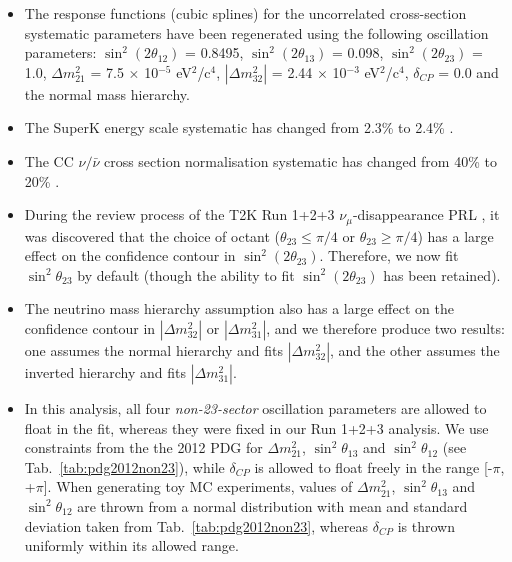 \begin{itemize}
\item 
The response functions (cubic splines) for the uncorrelated cross-section systematic parameters have been regenerated using the
following oscillation parameters: $\sin^2(2\theta_{12})$ = 0.8495, $\sin^2(2\theta_{13})$ = 0.098, $\sin^2(2\theta_{23})$ = 1.0, 
$\Delta m^2_{21}$ = 7.5 $\times$ 10$^{-5}$ eV$^{2}$/c$^{4}$, $|\Delta m^2_{32}|$ = 2.44 $\times$ 10$^{-3}$ eV$^{2}$/c$^{4}$, 
$\delta_{CP}$ = 0.0 and the normal mass hierarchy.

\item 
The SuperK energy scale systematic has changed from 2.3\% to 2.4\% \cite{SuperkEScale2013}.

\item 
The CC $\nu/\bar{\nu}$ cross section normalisation systematic has changed from 40\% to 20\% \cite{NIWGNuBarErr}.

\item 
During the review process of the T2K Run 1+2+3 $\nu_{\mu}$-disappearance PRL \cite{T2KRun123Disapp}, it was discovered that the 
choice of octant ($\theta_{23} \leq \pi/4$ or $\theta_{23} \geq \pi/4$) has a large effect on the confidence contour in 
$\sin^2(2\theta_{23})$. Therefore, we now fit $\sin^2\theta_{23}$ by default (though the ability to fit $\sin^2(2\theta_{23})$ 
has been retained).

\item 
The neutrino mass hierarchy assumption also has a large effect on the confidence contour in $|\Delta m^2_{32}|$ or $|\Delta m^2_{31}|$, 
and we therefore produce two results: one assumes the normal hierarchy and fits $|\Delta m^2_{32}|$, and the other assumes the inverted 
hierarchy and fits $|\Delta m^2_{31}|$.

\item 
In this analysis, all four \emph{non-23-sector} oscillation parameters are allowed to float in the fit, whereas they were fixed in our 
Run 1+2+3 analysis. 
We use constraints from the the 2012 PDG for $\Delta m^2_{21}$, $\sin^2\theta_{13}$ and $\sin^2\theta_{12}$ (see Tab.\ \ref{tab:pdg2012non23}), 
while $\delta_{CP}$ is allowed to float freely in the range [-$\pi$, +$\pi$].
When generating toy MC experiments, values of $\Delta m^2_{21}$, $\sin^2\theta_{13}$ and $\sin^2\theta_{12}$ are
thrown from a normal distribution with mean and standard deviation taken from Tab.\ \ref{tab:pdg2012non23},
whereas $\delta_{CP}$ is thrown uniformly within its allowed range. 


\end{itemize}

